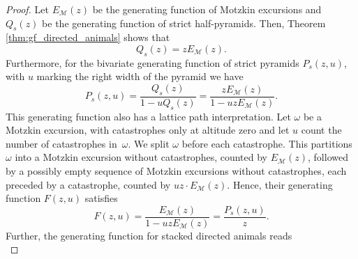 \begin{proof}
  Let $E_{\mathcal{M}}(z)$ be the generating function of Motzkin excursions and $Q_s(z)$ be the generating function of strict half-pyramids.
  Then, Theorem \ref{thm:gf_directed_animals} shows that 
  \begin{equation}\label{eq:Qs}
    Q_s(z) = zE_\mathcal{M}(z).
  \end{equation}
  Furthermore, for the bivariate generating function of strict pyramids $P_s(z,u)$, with $u$ marking the right width of the pyramid we have 
  $$
    P_s(z,u) = \frac{Q_s(z)}{1-uQ_s(z)} = \frac{zE_\mathcal{M}(z)}{1-uzE_\mathcal{M}(z)}.
  $$
  This generating function also has a lattice path interpretation.
  Let $\omega$ be a Motzkin excursion, with catastrophes only at altitude zero and let $u$ count the number of catastrophes in~$\omega$. We split $\omega$ before each catastrophe. This partitions $\omega$ into a Motzkin excursion without catastrophes, counted by $E_\mathcal{M}(z)$, followed by a possibly empty sequence of Motzkin excursions without catastrophes, each preceded by a catastrophe, counted by $u z \cdot E_\mathcal{M}(z)$.
  Hence, their generating function $F(z,u)$ satisfies
  \begin{equation}\label{eq:Ps}
    F(z,u) = \frac{E_\mathcal{M}(z)}{1-uzE_\mathcal{M}(z)} = \frac{P_s(z,u)}{z}.
  \end{equation}
  Further, the generating function for stacked directed animals reads 
  \begin{equation}\label{eq:S}

\end{equation}
\end{proof}
